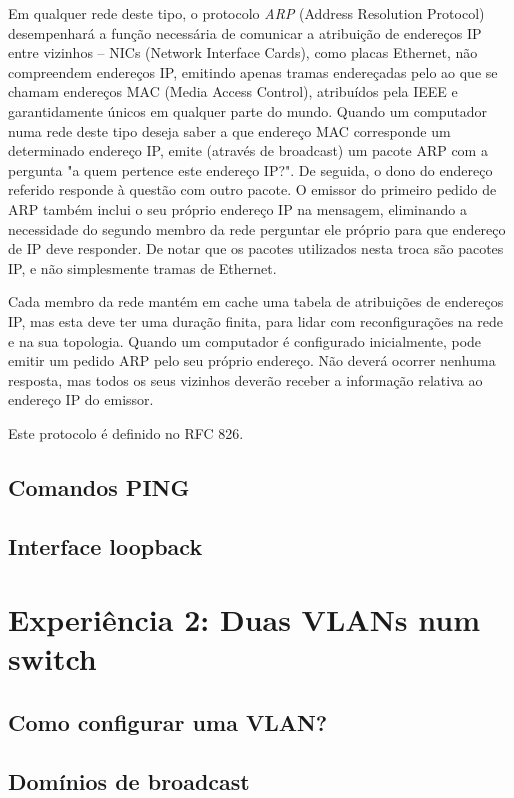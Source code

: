 \documentclass[a4paper,11pt,titlepage]{article}
\begin{document}
Em qualquer rede deste tipo, o protocolo \emph{ARP} (Address Resolution Protocol)
desempenhará a função necessária de comunicar a atribuição de endereços IP
entre vizinhos -- NICs (Network Interface Cards), como placas Ethernet, não
compreendem endereços IP, emitindo apenas tramas endereçadas pelo ao que se
chamam endereços MAC (Media Access Control), atribuídos pela IEEE e
garantidamente únicos em qualquer parte do mundo. Quando um computador numa
rede deste tipo deseja saber a que endereço MAC corresponde um determinado
endereço IP, emite (através de broadcast) um pacote ARP com a pergunta "a quem
pertence este endereço IP?". De seguida, o dono do endereço referido responde à
questão com outro pacote. O emissor do primeiro pedido de ARP também inclui o
seu próprio endereço IP na mensagem, eliminando a necessidade do segundo membro
da rede perguntar ele próprio para que endereço de IP deve responder.
De notar que os pacotes utilizados nesta troca são pacotes IP, e não
simplesmente tramas de Ethernet.

Cada membro da rede mantém em cache uma tabela de atribuições de endereços IP,
mas esta deve ter uma duração finita, para lidar com reconfigurações na rede e
na sua topologia. Quando um computador é configurado inicialmente, pode emitir
um pedido ARP pelo seu próprio endereço. Não deverá ocorrer nenhuma resposta,
mas todos os seus vizinhos deverão receber a informação relativa ao endereço IP
do emissor.

Este protocolo é definido no RFC 826.

\subsection{Comandos PING}

\subsection{Interface loopback}

\section{Experiência 2: Duas VLANs num switch }

\subsection{Como configurar uma VLAN?}

\subsection{Domínios de broadcast}
\end{document}
